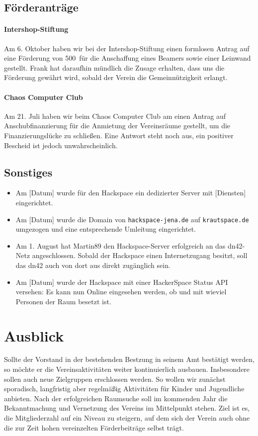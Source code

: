 \documentclass[10pt,DIV16]{scrartcl}
\begin{document}
\subsection{Förderanträge}

\paragraph{Intershop-Stiftung}

Am 6. Oktober haben wir bei der Intershop-Stiftung einen formlosen Antrag auf
eine Förderung von 500\EUR\ für die Anschaffung eines Beamers sowie einer
Leinwand gestellt.  Frank hat daraufhin mündlich die Zusage erhalten, dass uns
die Förderung gewährt wird, sobald der Verein die Gemeinnützigkeit erlangt.

\paragraph{Chaos Computer Club}

Am 21. Juli haben wir beim Chaos Computer Club am einen Antrag auf 
Anschubfinanzierung für die Anmietung der Vereinsräume gestellt, um 
die Finanzierungslücke zu schließen. Eine Antwort steht noch aus, 
ein positiver Bescheid ist jedoch unwahrscheinlich.

\subsection{Sonstiges}

\begin{itemize}
	\item
		Am [Datum] wurde für den Hackspace ein dedizierter Server mit
		[Diensten] eingerichtet.
	\item
		Am [Datum] wurde die Domain von \texttt{hackspace-jena.de} auf
		\texttt{krautspace.de} umgezogen und eine entsprechende Umleitung
		eingerichtet.
	\item
		Am 1. August hat Martin89 den Hackspace-Server erfolgreich an das
		dn42-Netz angeschlossen.  Sobald der Hackspace einen Internetzugang
		besitzt, soll das dn42 auch von dort aus direkt zugänglich sein.
	\item
		Am [Datum] wurde der Hackspace mit einer HackerSpace Status API
		versehen:  Es kann nun Online eingesehen werden, ob und mit wieviel
		Personen der Raum besetzt ist.
\end{itemize}

\section{Ausblick}

Sollte der Vorstand in der bestehenden Bestzung in seinem Amt bestätigt
werden, so möchte er die Vereinsaktivitäten weiter kontinuierlich ausbauen.
Insbesondere sollen auch neue Zielgruppen erschlossen werden.  So wollen wir
zunächst sporadisch, langfristig aber regelmäßig Aktivitäten für Kinder und
Jugendliche anbieten.  Nach der erfolgreichen Raumsuche soll im kommenden Jahr
die Bekanntmachung und Vernetzung des Vereins im Mittelpunkt stehen.  Ziel ist
es, die Mitgliederzahl auf ein Niveau zu steigern, auf dem sich der Verein
auch ohne die zur Zeit hohen vereinzelten Förderbeiträge selbst trägt.
\end{document}
